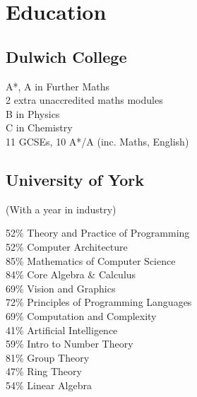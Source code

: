 \documentclass[11pt, a4paper]{cv}
\begin{document}
\begin{minipage}[t]{0.66\textwidth}

\section{Education} 

\begin{minipage}[t]{0.4\textwidth}
\subsection{Dulwich College}

A*, A in Further Maths \\
2 extra unaccredited maths modules \\
B in Physics \\
C in Chemistry \\\vspace{4pt}
11 GCSEs, 10 A*/A (inc. Maths, English)

\end{minipage}
\begin{minipage}[t]{0.55\textwidth}
\subsection{University of York}

(With a year in industry) \\\vspace{4pt}
\vspace{4pt}

52\% Theory and Practice of Programming \\
52\% Computer Architecture \\
85\% Mathematics of Computer Science \\
84\% Core Algebra \& Calculus \\
\vspace{0.5em}
69\% Vision and Graphics \\
72\% Principles of Programming Languages \\
69\% Computation and Complexity \\
41\% Artificial Intelligence \\
59\% Intro to Number Theory \\
81\% Group Theory \\
47\% Ring Theory \\
54\% Linear Algebra

\end{minipage}

\sectionspace %

\end{minipage} %
\end{document}
